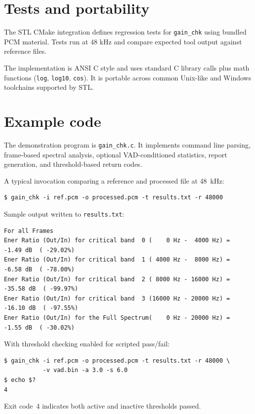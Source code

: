 \section{Tests and portability}
\label{sec:gain_chk-tests}

The STL CMake integration defines regression tests for \texttt{gain\_chk}
using bundled PCM material. Tests run at 48 kHz and compare expected tool
output against reference files.

The implementation is ANSI C style and uses standard C library calls plus
math functions (\texttt{log}, \texttt{log10}, \texttt{cos}). It is portable
across common Unix-like and Windows toolchains supported by STL.

\section{Example code}
\label{sec:gain_chk-example}

The demonstration program is \texttt{gain\_chk.c}. It implements command
line parsing, frame-based spectral analysis, optional VAD-conditioned
statistics, report generation, and threshold-based return codes.

A typical invocation comparing a reference and processed file at 48~kHz:

{\tt {\small
\begin{verbatim}
$ gain_chk -i ref.pcm -o processed.pcm -t results.txt -r 48000
\end{verbatim}
}}

\noindent Sample output written to \texttt{results.txt}:

{\tt {\small
\begin{verbatim}
For all Frames
Ener Ratio (Out/In) for critical band  0 (    0 Hz -  4000 Hz) =  -1.49 dB  ( -29.02%)
Ener Ratio (Out/In) for critical band  1 ( 4000 Hz -  8000 Hz) =  -6.58 dB  ( -78.00%)
Ener Ratio (Out/In) for critical band  2 ( 8000 Hz - 16000 Hz) = -35.58 dB  ( -99.97%)
Ener Ratio (Out/In) for critical band  3 (16000 Hz - 20000 Hz) = -16.10 dB  ( -97.55%)
Ener Ratio (Out/In) for the Full Spectrum(    0 Hz - 20000 Hz) =  -1.55 dB  ( -30.02%)
\end{verbatim}
}}

\noindent With threshold checking enabled for scripted pass/fail:

{\tt {\small
\begin{verbatim}
$ gain_chk -i ref.pcm -o processed.pcm -t results.txt -r 48000 \
           -v vad.bin -a 3.0 -s 6.0
$ echo $?
4
\end{verbatim}
}}

\noindent Exit code~4 indicates both active and inactive thresholds passed.

